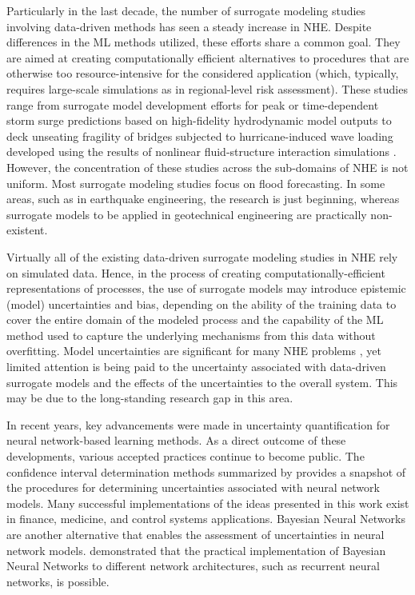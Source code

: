 Particularly in the last decade, the number of surrogate modeling studies involving data-driven methods has seen a steady increase in NHE. Despite differences in the ML methods utilized, these efforts share a common goal. They are aimed at creating computationally efficient alternatives to procedures that are otherwise too resource-intensive for the considered application (which, typically, requires large-scale simulations as in regional-level risk assessment). These studies range from surrogate model development efforts for peak or time-dependent storm surge predictions based on high-fidelity hydrodynamic model outputs \citep{jia2016surrogate} to deck unseating fragility of bridges subjected to hurricane-induced wave loading developed using the results of nonlinear fluid-structure interaction simulations \citep{ataei2015fragility}. However, the concentration of these studies across the sub-domains of NHE is not uniform. Most surrogate modeling studies focus on flood forecasting. In some areas, such as in earthquake engineering, the research is just beginning, whereas surrogate models to be applied in geotechnical engineering are practically non-existent.

Virtually all of the existing data-driven surrogate modeling studies in NHE rely on simulated data. Hence, in the process of creating computationally-efficient representations of processes, the use of surrogate models may introduce epistemic (model) uncertainties and bias, depending on the ability of the training data to cover the entire domain of the modeled process and the capability of the ML method used to capture the underlying mechanisms from this data without overfitting. Model uncertainties are significant for many NHE problems \citep{gokkaya2016quantifying}, yet limited attention is being paid to the uncertainty associated with data-driven surrogate models and the effects of the uncertainties to the overall system. This may be due to the long-standing research gap in this area.

In recent years, key advancements were made in uncertainty quantification for neural network-based learning methods. As a direct outcome of these developments, various accepted practices continue to become public. The confidence interval determination methods summarized by \citet{kabir2018neural} provides a snapshot of the procedures for determining uncertainties associated with neural network models. Many successful implementations of the ideas presented in this work exist in finance, medicine, and control systems applications. Bayesian Neural Networks \citep{blundell2015weight} are another alternative that enables the assessment of uncertainties in neural network models. \citet{mcdermott2019bayesian} demonstrated that the practical implementation of Bayesian Neural Networks to different network architectures, such as recurrent neural networks, is possible. 

